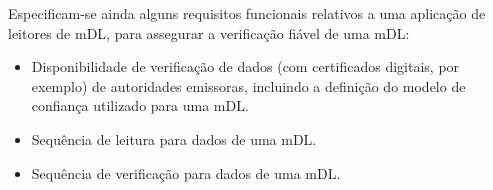 Especificam-se ainda alguns requisitos funcionais relativos a uma aplicação de leitores de mDL, para assegurar a verificação fiável de uma mDL:

\begin{itemize}
	\item Disponibilidade de verificação de dados (com certificados digitais, por exemplo) de autoridades emissoras, incluindo a definição do modelo de confiança utilizado para uma mDL.
	\item Sequência de leitura para dados de uma mDL.
	\item Sequência de verificação para dados de uma mDL.
\end{itemize}

